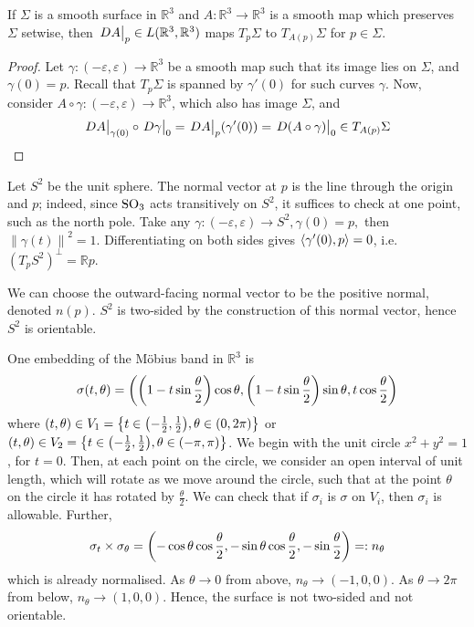 \documentclass[a4paper]{article}
\renewcommand{\epsilon}{\varepsilon}
\begin{document}
\begin{lemma}
	If \( \Sigma \) is a smooth surface in \( \mathbb R^3 \) and \( A \colon \mathbb R^3 \to \mathbb R^3 \) is a smooth map which preserves \( \Sigma \) setwise, then \( \eval{DA}_p \in L(\mathbb R^3, \mathbb R^3) \) maps \( T_p \Sigma \) to \( T_{A(p)} \Sigma \) for \( p \in \Sigma \).
\end{lemma}
\begin{proof}
	Let \( \gamma \colon (-\varepsilon, \varepsilon) \to \mathbb R^3 \) be a smooth map such that its image lies on \( \Sigma \), and \( \gamma(0) = p \).
	Recall that \( T_p \Sigma \) is spanned by \( \gamma'(0) \) for such curves \( \gamma \).
	Now, consider \( A \circ \gamma \colon (-\varepsilon, \varepsilon) \to \mathbb R^3 \), which also has image \( \Sigma \), and
	\[
		\teval{DA}{\gamma(0)} \circ \teval{D\gamma}{0} = \teval{DA}{p} \qty(\gamma'(0)) = \teval{D(A \circ \gamma)}{0} \in T_{A(p)} \Sigma
	\]
\end{proof}
\begin{example}
	Let \( S^2 \) be the unit sphere.
	The normal vector at \( p \) is the line through the origin and \( p \); indeed, since \( \mathrm{SO}_3 \) acts transitively on \( S^2 \), it suffices to check at one point, such as the north pole. Take any $ \gamma:(-\epsilon,\epsilon)\to S^2, \gamma(0)=p, $ then $ \left\| \gamma(t) \right\|^2 = 1 $. Differentiating on both sides gives $ \left\langle{\gamma'(0),p}\right\rangle = 0 $, i.e. $ (T_p S^2)^{\perp} = \mathbb{R} p $. 

	We can choose the outward-facing normal vector to be the positive normal, denoted \( n(p) \).
	\( S^2 \) is two-sided by the construction of this normal vector, hence \( S^2 \) is orientable.
\end{example}

\begin{example}
	One embedding of the M\"obius band in \( \mathbb R^3 \) is
	\[
		\sigma(t,\theta) = \qty(\qty(1 - t \sin \frac{\theta}{2})\cos \theta, \qty(1 - t \sin \frac{\theta}{2})\sin \theta, t \cos \frac{\theta}{2})
	\]
	where \( (t,\theta) \in V_1 = \qty{t \in \qty(-\frac{1}{2}, \frac{1}{2}), \theta \in (0,2\pi)} \) or \( (t,\theta) \in V_2 = \qty{t \in \qty(-\frac{1}{2}, \frac{1}{2}), \theta \in (-\pi, \pi)} \).
	We begin with the unit circle \( x^2 + y^2 = 1 \), for \( t = 0 \).
	Then, at each point on the circle, we consider an open interval of unit length, which will rotate as we move around the circle, such that at the point \( \theta \) on the circle it has rotated by \( \frac{\theta}{2} \).
	We can check that if \( \sigma_i \) is \( \sigma \) on \( V_i \), then \( \sigma_i \) is allowable.
	Further,
	\[
		\sigma_t \times \sigma_\theta = \qty(-\cos\theta \cos\frac{\theta}{2}, -\sin\theta \cos\frac{\theta}{2}, -\sin\frac{\theta}{2}) =: n_\theta
	\]
	which is already normalised.
	As \( \theta \to 0 \) from above, \( n_\theta \to (-1,0,0) \).
	As \( \theta \to 2\pi \) from below, \( n_\theta \to (1,0,0) \).
	Hence, the surface is not two-sided and not orientable. 
\end{example}
\end{document}
